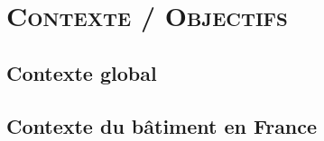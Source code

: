 \documentclass[xcolor=x11names, compress, 10pt]{beamer}
\begin{document}










\section{\scshape Contexte / Objectifs}



\subsection{Contexte global}
\begin{frame}[c]
    \vfill
    \vfill
\end{frame}



\subsection{Contexte du bâtiment en France}
\begin{frame}[c]
    \vfill
    \vfill
\end{frame}
\end{document}
